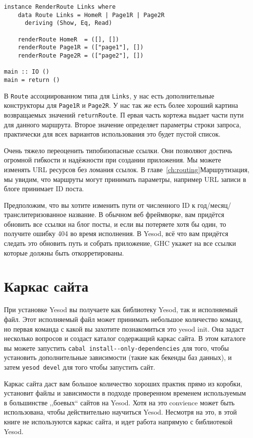 \begin{lstlisting}
instance RenderRoute Links where
    data Route Links = HomeR | Page1R | Page2R
      deriving (Show, Eq, Read)

    renderRoute HomeR  = ([], [])
    renderRoute Page1R = (["page1"], [])
    renderRoute Page2R = (["page2"], [])

main :: IO ()
main = return ()
\end{lstlisting}

В \lstinline'Route' ассоциированном типа для \lstinline'Links', у нас есть 
дополнительные конструкторы для \lstinline'Page1R' и \lstinline'Page2R'.
У нас так же есть более хороший картина возвращаемых значений \lstinline'returnRoute'. П
ервая часть кортежа выдает части пути для данного маршрута. Второе значение определяет
параметры строки запроса, практически для всех вариантов использования это будет пустой список.

Очень тяжело переоценить типобизопасные ссылки. Они позволяют достичь огромной гибкости и надёжности 
при создании приложения. Мы можете изменять URL ресурсов без ломания ссылок. 
В главе~\ref{ch:routing}Маршрутизация, мы увидим, что маршруты могут принимать параметры, 
например URL записи в блоге принимает ID поста.

Предположим, что вы хотите изменить пути от численного ID к год/месяц/транслитеризованное название. В обычном 
веб фреймворке, вам придётся обновить все ссылки на блог посты, и если вы потеряете хотя бы один, то 
получите ошибку 404 во время исполнения. В Yesod, всё что вам придётся следать это обновить 
путь и собрать приложение, GHC укажет на все ссылки которые должны быть откорретированы.

\section{Каркас сайта}

При установке Yesod вы получаете как библиотеку Yesod, так и исполняемый файл. Этот исполняемый файл
может принимать небольшое количество команд, но первая команда с какой вы захотите познакомиться это
yesod init. Она задаст несколько вопросов и создаст каталог содержащий каркас сайта. В этом каталоге
вы можете запустить \lstinline'cabal install--only-dependencies' для того, чтобы установить дополнительные
зависимости (такие как бекенды баз данных), и затем \lstinline'yesod devel' для того чтобы запустить сайт.

Каркас сайта даст вам большое количество хороших практик прямо из коробки, установит файлы и
зависимости в подходе проверенном временем используемым в большинстве ,,боевых`` сайтов на Yesod.
Хотя на это convience может быть использована, чтобы действительно научиться Yesod. 
Несмотря на это, в этой книге не используются каркас сайта, и идет работа напрямую с 
библиотекой Yesod.

